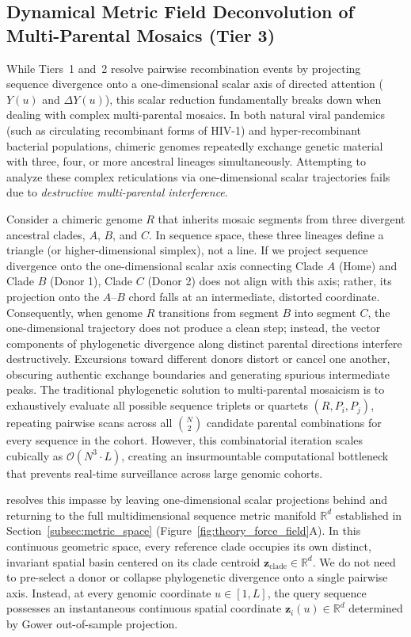 \subsection{Dynamical Metric Field Deconvolution of Multi-Parental Mosaics (Tier 3)}
\label{subsec:force_field_deconv}

While Tiers~1 and~2 resolve pairwise recombination events by projecting sequence divergence onto a one-dimensional scalar axis of directed attention ($Y(u)$ and $\Delta Y(u)$), this scalar reduction fundamentally breaks down when dealing with complex multi-parental mosaics.
In both natural viral pandemics (such as circulating recombinant forms of HIV-1) and hyper-recombinant bacterial populations, chimeric genomes repeatedly exchange genetic material with three, four, or more ancestral lineages simultaneously.
Attempting to analyze these complex reticulations via one-dimensional scalar trajectories fails due to \textit{destructive multi-parental interference}.

Consider a chimeric genome $R$ that inherits mosaic segments from three divergent ancestral clades, $A$, $B$, and $C$.
In sequence space, these three lineages define a triangle (or higher-dimensional simplex), not a line.
If we project sequence divergence onto the one-dimensional scalar axis connecting Clade $A$ (Home) and Clade $B$ (Donor 1), Clade $C$ (Donor 2) does not align with this axis; rather, its projection onto the $A\text{--}B$ chord falls at an intermediate, distorted coordinate.
Consequently, when genome $R$ transitions from segment $B$ into segment $C$, the one-dimensional trajectory does not produce a clean step; instead, the vector components of phylogenetic divergence along distinct parental directions interfere destructively.
Excursions toward different donors distort or cancel one another, obscuring authentic exchange boundaries and generating spurious intermediate peaks.
The traditional phylogenetic solution to multi-parental mosaicism is to exhaustively evaluate all possible sequence triplets or quartets $(R, P_i, P_j)$, repeating pairwise scans across all $\binom{N}{2}$ candidate parental combinations for every sequence in the cohort.
However, this combinatorial iteration scales cubically as $\mathcal{O}(N^3 \cdot L)$, creating an insurmountable computational bottleneck that prevents real-time surveillance across large genomic cohorts.

\RhizAeon resolves this impasse by leaving one-dimensional scalar projections behind and returning to the full multidimensional sequence metric manifold $\mathbb{R}^d$ established in Section~\ref{subsec:metric_space} (Figure~\ref{fig:theory_force_field}A).
In this continuous geometric space, every reference clade occupies its own distinct, invariant spatial basin centered on its clade centroid $\mathbf{z}_{\text{clade}} \in \mathbb{R}^d$.
We do not need to pre-select a donor or collapse phylogenetic divergence onto a single pairwise axis.
Instead, at every genomic coordinate $u \in [1, L]$, the query sequence possesses an instantaneous continuous spatial coordinate $\mathbf{z}_i(u) \in \mathbb{R}^d$ determined by Gower out-of-sample projection.

